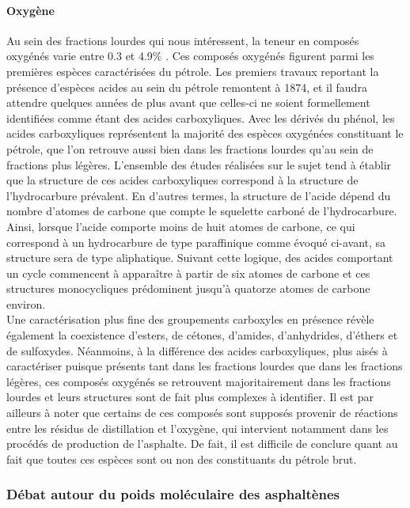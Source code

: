 \paragraph{Oxygène}
Au sein des fractions lourdes qui nous intéressent, la teneur en composés oxygénés varie entre 0.3 et 4.9\% \cite{speight2004petroleum}. Ces composés oxygénés figurent parmi les premières espèces caractérisées du pétrole. Les premiers travaux reportant la présence d'espèces acides au sein du pétrole remontent à 1874, et il faudra attendre quelques années de plus avant que celles-ci ne soient formellement identifiées comme étant des acides carboxyliques. Avec les dérivés du phénol, les acides carboxyliques représentent la majorité des espèces oxygénées constituant le pétrole, que l'on retrouve aussi bien dans les fractions lourdes qu'au sein de fractions plus légères. L'ensemble des études réalisées sur le sujet tend à établir que la structure de ces acides carboxyliques correspond à la structure de l'hydrocarbure prévalent. En d'autres termes, la structure de l'acide dépend du nombre d'atomes de carbone que compte le squelette carboné de l'hydrocarbure. Ainsi, lorsque l'acide comporte moins de huit atomes de carbone, ce qui correspond à un hydrocarbure de type paraffinique comme évoqué ci-avant, sa structure sera de type aliphatique. Suivant cette logique, des acides comportant un cycle commencent à apparaître à partir de six atomes de carbone et ces structures monocycliques prédominent jusqu'à quatorze atomes de carbone environ.\\
Une caractérisation plus fine des groupements carboxyles en présence révèle également la coexistence d'esters, de cétones, d'amides, d'anhydrides, d'éthers et de sulfoxydes. Néanmoins, à la différence des acides carboxyliques, plus aisés à caractériser puisque présents tant dans les fractions lourdes que dans les fractions légères, ces composés oxygénés se retrouvent majoritairement dans les fractions lourdes et leurs structures sont de fait plus complexes à identifier. Il est par ailleurs à noter que certains de ces composés sont supposés provenir de réactions entre les résidus de distillation et l'oxygène, qui intervient notamment dans les procédés de production de l'asphalte. De fait, il est difficile de conclure quant au fait que toutes ces espèces sont ou non des constituants du pétrole brut. 


\subsubsection{Débat autour du poids moléculaire des asphaltènes}

